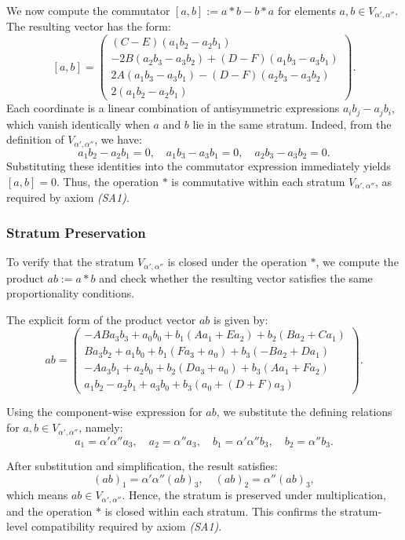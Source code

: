\documentclass[12pt]{article}
\theoremstyle{definition}
\theoremstyle{plain}
\theoremstyle{remark}
\begin{document}
We now compute the commutator \( [a, b] := a * b - b * a \) for elements \( a, b \in V_{\alpha', \alpha''} \). The resulting vector has the form:
\[
[a, b] =
\begin{pmatrix}
(C - E)(a_1 b_2 - a_2 b_1) \\
-2B(a_2 b_3 - a_3 b_2) + (D - F)(a_1 b_3 - a_3 b_1) \\
2A(a_1 b_3 - a_3 b_1) - (D - F)(a_2 b_3 - a_3 b_2) \\
2(a_1 b_2 - a_2 b_1)
\end{pmatrix}.
\]
Each coordinate is a linear combination of antisymmetric expressions \( a_i b_j - a_j b_i \), which vanish identically when \( a \) and \( b \) lie in the same stratum. Indeed, from the definition of \( V_{\alpha', \alpha''} \), we have:
\[
a_1 b_2 - a_2 b_1 = 0, \quad a_1 b_3 - a_3 b_1 = 0, \quad a_2 b_3 - a_3 b_2 = 0.
\]
Substituting these identities into the commutator expression immediately yields \( [a, b] = 0 \). Thus, the operation \( * \) is commutative within each stratum \( V_{\alpha', \alpha''} \), as required by axiom \emph{(SA1)}.

\subsubsection{Stratum Preservation}

To verify that the stratum \( V_{\alpha', \alpha''} \) is closed under the operation \( * \), we compute the product \( ab := a * b \) and check whether the resulting vector satisfies the same proportionality conditions.

The explicit form of the product vector \( ab \) is given by:
\[
ab =
\begin{pmatrix}
-A B a_3 b_3 + a_0 b_0 + b_1 (A a_1 + E a_2) + b_2 (B a_2 + C a_1) \\
B a_3 b_2 + a_1 b_0 + b_1 (F a_3 + a_0) + b_3 (-B a_2 + D a_1) \\
- A a_3 b_1 + a_2 b_0 + b_2 (D a_3 + a_0) + b_3 (A a_1 + F a_2) \\
a_1 b_2 - a_2 b_1 + a_3 b_0 + b_3 (a_0 + (D + F) a_3)
\end{pmatrix}.
\]

Using the component-wise expression for \( ab \), we substitute the defining relations for \( a, b \in V_{\alpha', \alpha''} \), namely:
\[
a_1 = \alpha' \alpha'' a_3, \quad a_2 = \alpha'' a_3, \quad
b_1 = \alpha' \alpha'' b_3, \quad b_2 = \alpha'' b_3.
\]

After substitution and simplification, the result satisfies:
\[
(ab)_1 = \alpha' \alpha'' (ab)_3, \quad (ab)_2 = \alpha'' (ab)_3,
\]
which means \( ab \in V_{\alpha', \alpha''} \). Hence, the stratum is preserved under multiplication, and the operation \( * \) is closed within each stratum. This confirms the stratum-level compatibility required by axiom \emph{(SA1)}.
\end{document}
